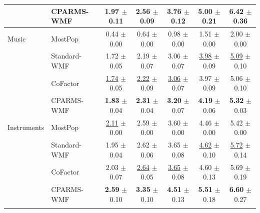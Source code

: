 \documentclass[pdflatex,sn-vancouver-num]{sn-jnl}%
\theoremstyle{thmstyleone}%
\theoremstyle{thmstyletwo}%
\theoremstyle{thmstylethree}%
\begin{document}
\begin{table}
\begin{tabular*}{\textheight}{@{\extracolsep{\fill}}llccccc@{}}
              & CPARMS-WMF & \textbf{1.97} $\pm$ 0.11 & \textbf{2.56} $\pm$ 0.09 & \textbf{3.76} $\pm$ 0.12 & \textbf{5.00} $\pm$ 0.21 & \textbf{6.42} $\pm$ 0.36 \\
\midrule
Music         & MostPop & 0.44 $\pm$ 0.00 & 0.64 $\pm$ 0.00 & 0.98 $\pm$ 0.00 & 1.51 $\pm$ 0.00 & 2.00 $\pm$ 0.00 \\
              & Standard-WMF & 1.72 $\pm$ 0.05 & 2.19 $\pm$ 0.07 & 3.06 $\pm$ 0.07 & \underline{3.98} $\pm$ 0.09 & \underline{5.09} $\pm$ 0.10 \\
              & CoFactor & \underline{1.74} $\pm$ 0.05 & \underline{2.22} $\pm$ 0.09 & \underline{3.06} $\pm$ 0.07 & 3.97 $\pm$ 0.09 & 5.06 $\pm$ 0.10 \\
              & CPARMS-WMF & \textbf{1.83} $\pm$ 0.04 & \textbf{2.31} $\pm$ 0.04 & \textbf{3.20} $\pm$ 0.07 & \textbf{4.19} $\pm$ 0.06 & \textbf{5.32} $\pm$ 0.03 \\
\midrule
Instruments   & MostPop & \underline{2.11} $\pm$ 0.00 & 2.59 $\pm$ 0.00 & 3.60 $\pm$ 0.00 & 4.46 $\pm$ 0.00 & 5.42 $\pm$ 0.00 \\
              & Standard-WMF & 1.95 $\pm$ 0.04 & 2.62 $\pm$ 0.06 & 3.65 $\pm$ 0.08 & \underline{4.62} $\pm$ 0.10 & \underline{5.72} $\pm$ 0.14 \\
              & CoFactor & 2.03 $\pm$ 0.07 & \underline{2.64} $\pm$ 0.05 & \underline{3.65} $\pm$ 0.08 & 4.60 $\pm$ 0.13 & 5.69 $\pm$ 0.19 \\
              & CPARMS-WMF & \textbf{2.59} $\pm$ 0.10 & \textbf{3.35} $\pm$ 0.10 & \textbf{4.51} $\pm$ 0.13 & \textbf{5.51} $\pm$ 0.18 & \textbf{6.60} $\pm$ 0.27 \\
\botrule
\end{tabular*}
\end{table}

\clearpage
\end{document}
